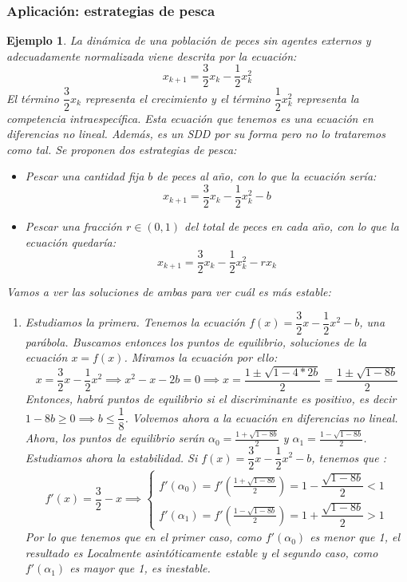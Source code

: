 \documentclass[11pt, a4paper, titlepage]{article}
\theoremstyle{theorem-style}
\theoremstyle{definition-style}
\theoremstyle{remark-style}
\theoremstyle{example-style}
\newtheorem*{ejemplo}{Ejemplo}
\begin{document}
\subsubsection{Aplicación: estrategias de pesca}
\begin{ejemplo}
	La dinámica de una población de peces sin agentes externos y adecuadamente normalizada viene descrita por la ecuación:
	\[
	x_{k+1}= \dfrac{3}{2}x_k -\dfrac{1}{2} x_k^2
	\]
	El término $\dfrac{3}{2}x_k$ representa el crecimiento y el término $\dfrac{1}{2} x_k^2$ representa la competencia intraespecífica.
	Esta ecuación que tenemos es una ecuación en diferencias no lineal. Además, es un SDD por su forma pero no lo trataremos como tal.
	Se proponen dos estrategias de pesca:
	\begin{itemize}
	\item Pescar una cantidad fija $b$ de peces al año, con lo que la ecuación sería:
	\[
	x_{k+1}= \dfrac{3}{2}x_k -\dfrac{1}{2} x_k^2 -b
	\]
	\item Pescar una fracción $r\in(0,1)$ del total de peces en cada año, con lo que la ecuación quedaría:
	\[
	x_{k+1}= \dfrac{3}{2}x_k -\dfrac{1}{2} x_k^2 -rx_k
	\]
	
\end{itemize}
Vamos a ver las soluciones de ambas para ver cuál es más estable:
\begin{enumerate}
	\item Estudiamos la primera. Tenemos la ecuación $f(x) = \dfrac{3}{2}x -\dfrac{1}{2} x^2 -b $, una parábola.
	Buscamos entonces los puntos de equilibrio, soluciones de la ecuación $x=f(x)$. Miramos la ecuación por ello:
	\[
	x= \dfrac{3}{2}x -\dfrac{1}{2} x^2 \implies x^2 -x - 2b = 0\implies x= \frac{1\pm \sqrt{1-4*2b}}{2}= \frac{1\pm \sqrt{1-8b}}{2}
	\]
	Entonces, habrá puntos de equilibrio si el discriminante es positivo, es decir $1-8b \geq 0 \implies b \leq \dfrac{1}{8}$. Volvemos ahora a la ecuación en diferencias no lineal.
	Ahora, los puntos de equilibrio serán $\alpha_0 = \frac{1 + \sqrt{1-8b}}{2}$ y $\alpha_1 = \frac{1- \sqrt{1-8b}}{2}$. Estudiamos ahora la estabilidad. Si $f(x) = \dfrac{3}{2}x-\dfrac{1}{2}x^2 -b$, tenemos que :
	\[
	f'(x)= \dfrac{3}{2}-x \implies \begin{cases}
	f'(\alpha_0) = f'(\frac{1 + \sqrt{1-8b}}{2}) = 1- \dfrac{\sqrt{1-8b}}{2} <1\\
	f'(\alpha_1) = f'(\frac{1 - \sqrt{1-8b}}{2})=1+ \dfrac{\sqrt{1-8b}}{2} > 1
\end{cases}
	\]
	Por lo que tenemos que en el primer caso, como $f'(\alpha_0)$ es menor que 1, el resultado es Localmente asintóticamente estable y el segundo caso, como $f'(\alpha_1)$ es mayor que 1, es inestable.
	

\end{enumerate}
\end{ejemplo}
\end{document}
